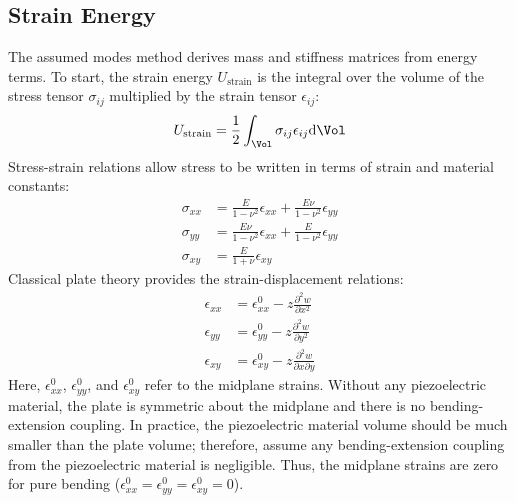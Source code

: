 \documentclass{article}
\begin{document}
\begin{body}
\begin{appendices}
{\subsection{Strain Energy}
The assumed modes method derives mass and stiffness matrices from energy terms. To start, the strain energy $U_{\text{strain}}$ is the integral over the volume of the stress tensor $\sigma_{ij}$ multiplied by the strain tensor $\epsilon_{ij}$:
\begin{equation}
U_{\text{strain}}=\frac{1}{2}\int_{\Vol} \sigma_{ij} \epsilon_{ij} \text{d}\Vol
\end{equation}
Stress-strain relations allow stress to be written in terms of strain and material constants:
\begin{align}
\sigma_{xx}&=\frac{E}{1-\nu^2} \epsilon_{xx}+\frac{E\nu}{1-\nu^2}\epsilon_{yy} \\
\sigma_{yy}&=\frac{E\nu}{1-\nu^2} \epsilon_{xx}+\frac{E}{1-\nu^2}\epsilon_{yy} \\
\sigma_{xy}&=\frac{E}{1+\nu} \epsilon_{xy}
\end{align}
Classical plate theory provides the strain-displacement relations:
\begin{align}
\epsilon_{xx}&=\epsilon_{xx}^0-z\frac{\partial^2 w}{\partial x^2} \\
\epsilon_{yy}&=\epsilon_{yy}^0-z\frac{\partial^2 w}{\partial y^2} \\
\epsilon_{xy}&=\epsilon_{xy}^0-z\frac{\partial^2 w}{\partial x \partial y}
\end{align}
Here, $\epsilon_{xx}^0$, $\epsilon_{yy}^0$, and $\epsilon_{xy}^0$ refer to the midplane strains. Without any piezoelectric material, the plate is symmetric about the midplane and there is no bending-extension coupling. In practice, the piezoelectric material volume should be much smaller than the plate volume; therefore, assume any bending-extension coupling from the piezoelectric material is negligible. Thus, the midplane strains are zero for pure bending ($\epsilon_{xx}^0=\epsilon_{yy}^0=\epsilon_{xy}^0=0$).

}
\end{appendices}
\end{body}
\end{document}

